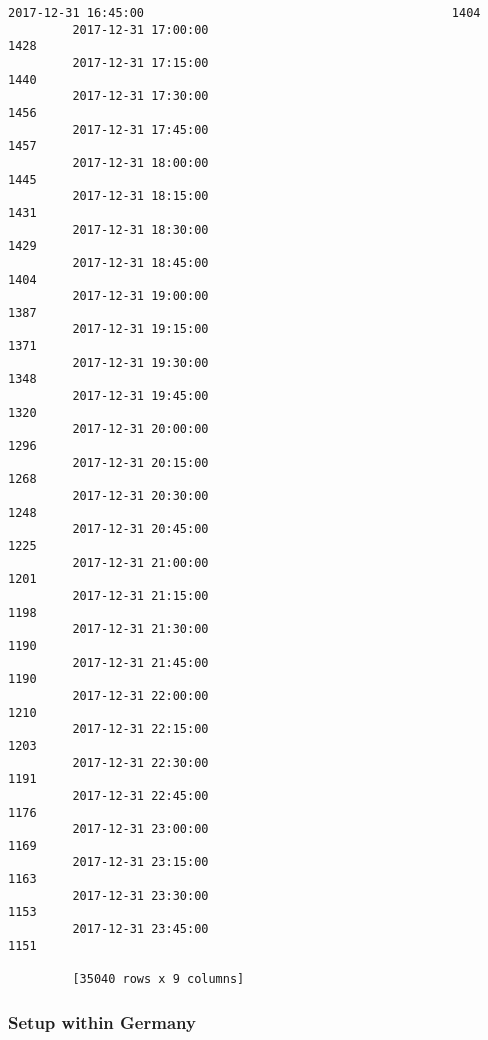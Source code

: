\documentclass[11pt]{article}
\begin{document}
\begin{Verbatim}[commandchars=\\\{\}]
         2017-12-31 16:45:00                                           1404  
         2017-12-31 17:00:00                                           1428  
         2017-12-31 17:15:00                                           1440  
         2017-12-31 17:30:00                                           1456  
         2017-12-31 17:45:00                                           1457  
         2017-12-31 18:00:00                                           1445  
         2017-12-31 18:15:00                                           1431  
         2017-12-31 18:30:00                                           1429  
         2017-12-31 18:45:00                                           1404  
         2017-12-31 19:00:00                                           1387  
         2017-12-31 19:15:00                                           1371  
         2017-12-31 19:30:00                                           1348  
         2017-12-31 19:45:00                                           1320  
         2017-12-31 20:00:00                                           1296  
         2017-12-31 20:15:00                                           1268  
         2017-12-31 20:30:00                                           1248  
         2017-12-31 20:45:00                                           1225  
         2017-12-31 21:00:00                                           1201  
         2017-12-31 21:15:00                                           1198  
         2017-12-31 21:30:00                                           1190  
         2017-12-31 21:45:00                                           1190  
         2017-12-31 22:00:00                                           1210  
         2017-12-31 22:15:00                                           1203  
         2017-12-31 22:30:00                                           1191  
         2017-12-31 22:45:00                                           1176  
         2017-12-31 23:00:00                                           1169  
         2017-12-31 23:15:00                                           1163  
         2017-12-31 23:30:00                                           1153  
         2017-12-31 23:45:00                                           1151  
         
         [35040 rows x 9 columns]
\end{Verbatim}
            
    \subsubsection{Setup within Germany}\label{setup-within-germany}
\end{document}
